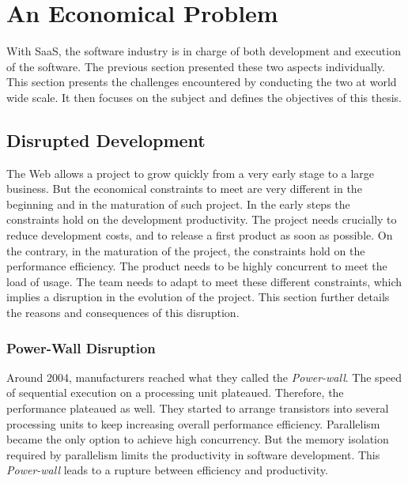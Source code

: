 \section{An Economical Problem} \label{chapter2:problem-statement}

With SaaS, the software industry is in charge of both development and execution of the software.
The previous section presented these two aspects individually.
This section presents the challenges encountered by conducting the two at world wide scale.
It then focuses on the subject and defines the objectives of this thesis.

\subsection{Disrupted Development}

The Web allows a project to grow quickly from a very early stage to a large business.
But the economical constraints to meet are very different in the beginning and in the maturation of such project.
In the early steps the constraints hold on the development productivity.
The project needs crucially to reduce development costs, and to release a first product as soon as possible.
On the contrary, in the maturation of the project, the constraints hold on the performance efficiency.
The product needs to be highly concurrent to meet the load of usage.
The team needs to adapt to meet these different constraints, which implies a disruption in the evolution of the project.
This section further details the reasons and consequences of this disruption.

\subsubsection{Power-Wall Disruption}


Around 2004, manufacturers reached what they called the \textit{Power-wall}.
The speed of sequential execution on a processing unit plateaued.
Therefore, the performance plateaued as well.
They started to arrange transistors into several processing units to keep increasing overall performance efficiency. %
Parallelism became the only option to achieve high concurrency. %
But the memory isolation required by parallelism limits the productivity in software development.
This \textit{Power-wall} leads to a rupture between efficiency and productivity.

